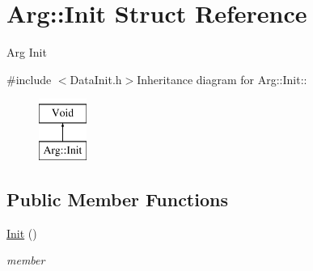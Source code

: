\hypertarget{structArg_1_1Init}{
\section{Arg::Init Struct Reference}
\label{structArg_1_1Init}
}


Arg Init  


{\ttfamily \#include $<$DataInit.h$>$}Inheritance diagram for Arg::Init::\begin{figure}[H]
\begin{center}
\leavevmode
\includegraphics[height=2cm]{structArg_1_1Init}
\end{center}
\end{figure}
\subsection*{Public Member Functions}
\begin{DoxyCompactItemize}
\item 
\hypertarget{structArg_1_1Init_a15249bf467ae3e0d9a280c1ae388d0ea}{
\hyperlink{structArg_1_1Init_a15249bf467ae3e0d9a280c1ae388d0ea}{Init} ()}
\label{structArg_1_1Init_a15249bf467ae3e0d9a280c1ae388d0ea}

\begin{DoxyCompactList}\small\item\em member \item\end{DoxyCompactList}\end{DoxyCompactItemize}
